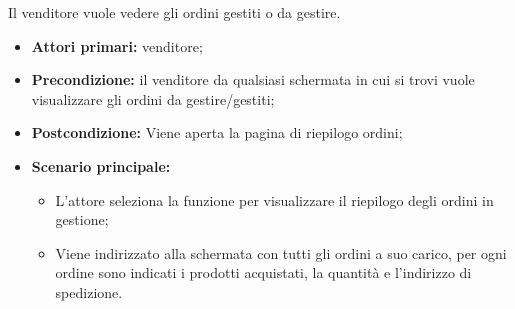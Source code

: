 
Il venditore vuole vedere gli ordini gestiti o da gestire.
\begin{itemize}
    \item \textbf{Attori primari:} venditore;
    \item \textbf{Precondizione:} il venditore da qualsiasi schermata in cui si trovi vuole visualizzare gli ordini da gestire/gestiti;
    \item \textbf{Postcondizione:} Viene aperta la pagina di riepilogo ordini;
    \item \textbf{Scenario principale:}
    \begin{itemize}
        \item L'attore seleziona la funzione per visualizzare il riepilogo degli ordini in gestione;
        \item Viene indirizzato alla schermata con tutti gli ordini a suo carico, per ogni ordine sono indicati i prodotti acquistati, la quantità e l'indirizzo di spedizione.
    \end{itemize}
\end{itemize}
